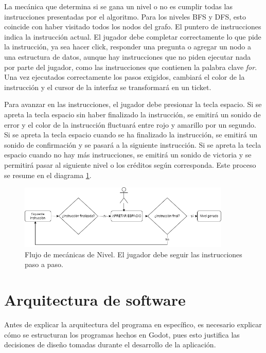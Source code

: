 La mecánica que determina si se gana un nivel o no es cumplir todas las instrucciones presentadas por el algoritmo. Para los niveles BFS y DFS, esto coincide con haber visitado todos los nodos del grafo. El puntero de instrucciones indica la instrucción actual. El jugador debe completar correctamente lo que pide la instrucción, ya sea hacer click, responder una pregunta o agregar un nodo a una estructura de datos, aunque hay instrucciones que no piden ejecutar nada por parte del jugador, como las instrucciones que contienen la palabra clave \textit{for}. Una vez ejecutados correctamente los pasos exigidos, cambiará el color de la instrucción y el cursor de la interfaz se transformará en un ticket.

Para avanzar en las instrucciones, el jugador debe presionar la tecla espacio. Si se apreta la tecla espacio sin haber finalizado la instrucción, se emitirá un sonido de error y el color de la instrucción fluctuará entre rojo y amarillo por un segundo. Si se apreta la tecla espacio cuando se ha finalizado la instrucción, se emitirá un sonido de confirmación y se pasará a la siguiente instrucción. Si se apreta la tecla espacio cuando no hay más instrucciones, se emitirá un sonido de victoria y se permitirá pasar al siguiente nivel o los créditos según corresponda. Este proceso se resume en el diagrama \ref{FlujoMecanicaDeNivel}.

\begin{figure}[h]
	\centering
	\includegraphics[width=0.9\textwidth]{imagenes/FlujoDeMecanicasDeNivel.drawio.png}
	\caption{Flujo de mecánicas de Nivel. El jugador debe seguir las instrucciones paso a paso.}
	\label{FlujoMecanicaDeNivel}
\end{figure}



\section{Arquitectura de software}

Antes de explicar la arquitectura del programa en específico, es necesario explicar cómo se estructuran los programas hechos en Godot, pues esto justifica las decisiones de diseño tomadas durante el desarrollo de la aplicación.

